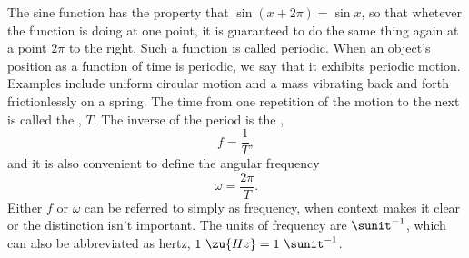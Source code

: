 The sine function has the property that $\sin (x+2\pi)=\sin x$, so that whetever
the function is doing at one point, it is guaranteed to do the same thing again
at a point $2\pi$ to the right. Such a function is called periodic. When an object's
position as a function of time is periodic, we say that it exhibits periodic motion.
Examples include uniform circular motion and a mass vibrating back and forth frictionlessly
on a spring. The time from one repetition of the motion to the next is called the , $T$.
The inverse of the period is the ,
\begin{equation*}
  f = \frac{1}{T},
\end{equation*}
and it is also convenient to define the angular frequency
\begin{equation*}
  \omega = \frac{2\pi}{T}.
\end{equation*}
Either $f$ or $\omega$ can be referred to simply as frequency, when context
makes it clear or the distinction isn't important. The units of frequency
are $\sunit^{-1}$, which can also be abbreviated as hertz, $1\ \zu{Hz}=1\ \sunit^{-1}$.

